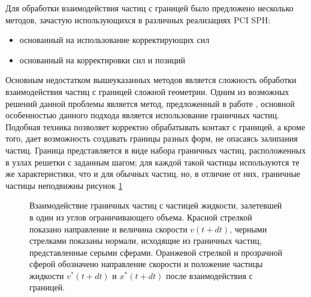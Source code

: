 Для обработки взаимодействия частиц с границей было предложено несколько методов, зачастую использующихся в различных реализациях PCI SPH:

\begin{itemize}
  \item основанный на использование корректирующих сил \cite {Müller2004}
  \item основанный на корректировки сил и позиций \cite {Becker2009}
\end{itemize}

Основным недостатком вышеуказанных методов является сложность обработки взаимодействия частиц с границей сложной геометрии. Одним из возможных решений данной проблемы является метод, предложенный в работе  \cite {Ihmsen2010}, основной особенностью данного подхода является использование граничных частиц. Подобная техника позволяет корректно обрабатывать контакт с границей, а кроме того, дает возможность создавать границы разных форм, не опасаясь залипания частиц. Граница представляется в виде набора граничных частиц, расположенных в узлах решетки с заданным шагом; для каждой такой частицы используются те же характеристики, что и для обычных частиц, но, в отличие от них, граничные частицы неподвижны рисунок \ref{fig:boundary}
\begin{figure}[ht]
  \caption{Взаимодействие граничных частиц с частицей жидкости, залетевшей в один из углов ограничивающего объема. Красной стрелкой показано направление и величина скорости \(v(t+dt)\), черными стрелками показаны нормали, исходящие из граничных частиц, представленные серыми сферами. Оранжевой стрелкой и прозрачной сферой обозначено направление скорости и положение частицы жидкости \(v^{*}(t+dt)\) и \(x^{*}(t+dt)\) после взаимодействия с границей.}
  \label{fig:boundary}
\end{figure}

